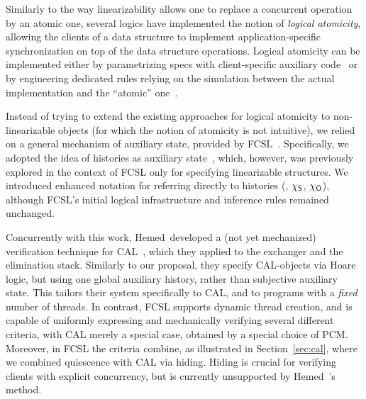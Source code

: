 Similarly to the way linearizability allows one to replace a
concurrent operation by an atomic one, several logics have implemented
the notion of \emph{logical atomicity}, allowing the clients of a data
structure to implement application-specific synchronization on top of
the data structure operations.
%
Logical atomicity can be implemented either by parametrizing specs
with client-specific auxiliary
code~\cite{Jacobs-Piessens:POPL11,Svendsen-al:ESOP13,Svendsen-Birkedal:ESOP14,Jung-al:POPL15}
or by engineering dedicated rules relying on the simulation between
the actual implementation and the ``atomic''
one~\cite{ArrozPincho-al:ECOOP14}.
%

Instead of trying to extend the existing approaches for logical
atomicity to non-linearizable objects (for which the notion of
atomicity is not intuitive), we relied on a general mechanism of
auxiliary state, provided by FCSL~\cite{Nanevski-al:ESOP14}. 
%
Specifically, we adopted the idea of histories as auxiliary
state~\cite{Sergey-al:ESOP15}, which, however, was previously explored
in the context of FCSL only for specifying linearizable structures.
%
%
% 
We introduced enhanced notation for referring directly to histories
(\eg, $\chi_{\mathsf{S}}$, $\chi_{\mathsf{O}}$), although FCSL's initial logical
infrastructure and inference rules remained unchanged.

Concurrently with this work, Hemed~\etal developed a (not yet
mechanized) verification technique for CAL~\cite{Hemed-al:DISC15},
which they applied to the exchanger and the elimination
stack. Similarly to our proposal, they specify CAL-objects via Hoare
logic, but using one global auxiliary history, rather than subjective
auxiliary state. This tailors their system specifically to CAL, and to
programs with a \emph{fixed} number of threads. In contrast, FCSL
supports dynamic thread creation, and is capable of uniformly
expressing and mechanically verifying several different criteria, with
CAL merely a special case, obtained by a special choice of
PCM. Moreover, in FCSL the criteria combine, as illustrated in
Section~\ref{sec:cal}, where we combined quiescence with CAL via
hiding. Hiding is crucial for verifying clients with explicit
concurrency, but is currently unsupported by Hemed~\etal's method.
%

